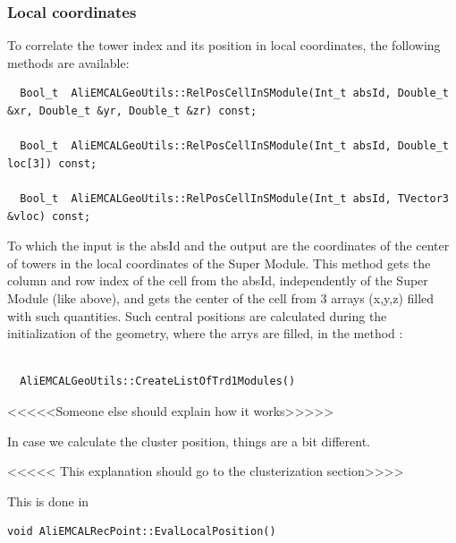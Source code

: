 \subsubsection{Local coordinates}

To correlate the tower index and its position in local coordinates, the following methods are available:

\begin{DDbox}{\linewidth}
\begin{lstlisting}
  Bool_t  AliEMCALGeoUtils::RelPosCellInSModule(Int_t absId, Double_t &xr, Double_t &yr, Double_t &zr) const;

  Bool_t  AliEMCALGeoUtils::RelPosCellInSModule(Int_t absId, Double_t loc[3]) const;

  Bool_t  AliEMCALGeoUtils::RelPosCellInSModule(Int_t absId, TVector3 &vloc) const;
\end{lstlisting}
\end{DDbox}

To which the input is the absId and the output are the coordinates of the center of towers in the local coordinates of the Super Module. This method gets the column and row index of the cell from the absId, independently of the Super Module (like above), and gets the center of the cell from 3 arrays (x,y,z) filled with such quantities. Such central positions are calculated during the initialization of the geometry, where the arrys are filled, in the method :

\begin{DDbox}{\linewidth}
\begin{lstlisting}

  AliEMCALGeoUtils::CreateListOfTrd1Modules()
\end{lstlisting}
\end{DDbox}

{\color{red}<<<<<Someone else should explain how it works>>>>>}

 

In case we calculate the cluster position, things are a bit different.

 

{\color{red}<<<<< This explanation should go to the clusterization section>>>>}

 

This is done in 

\begin{DDbox}{\linewidth}
\begin{lstlisting}
void AliEMCALRecPoint::EvalLocalPosition()
\end{lstlisting}
\end{DDbox}


